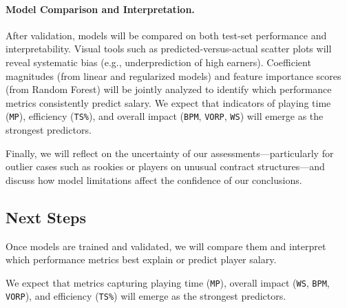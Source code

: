 \documentclass{article}
\theoremstyle{plain}
\theoremstyle{definition}
\theoremstyle{remark}
\begin{document}
\paragraph{Model Comparison and Interpretation.}
After validation, models will be compared on both test-set performance and interpretability. Visual tools such as predicted-versus-actual scatter plots will reveal systematic bias (e.g., underprediction of high earners). Coefficient magnitudes (from linear and regularized models) and feature importance scores (from Random Forest) will be jointly analyzed to identify which performance metrics consistently predict salary. We expect that indicators of playing time (\texttt{MP}), efficiency (\texttt{TS\%}), and overall impact (\texttt{BPM}, \texttt{VORP}, \texttt{WS}) will emerge as the strongest predictors.

Finally, we will reflect on the uncertainty of our assessments—particularly for outlier cases such as rookies or players on unusual contract structures—and discuss how model limitations affect the confidence of our conclusions.

\subsection*{Next Steps}

Once models are trained and validated, we will compare them and interpret which performance metrics best explain or predict player salary. 

We expect that metrics capturing playing time (\texttt{MP}), overall impact (\texttt{WS}, \texttt{BPM}, \texttt{VORP}), and efficiency (\texttt{TS\%}) will emerge as the strongest predictors.














\end{document}
